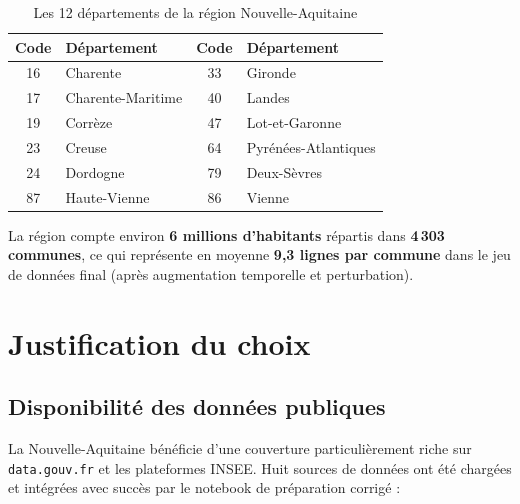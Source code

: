 \documentclass[12pt,a4paper,oneside]{report}
\begin{document}
\begin{table}[H]
  \centering
  \caption{Les 12 départements de la région Nouvelle-Aquitaine}
  \label{tab:departements}
  \begin{tabular}{clcl}
    \toprule
    \textbf{Code} & \textbf{Département} & \textbf{Code} & \textbf{Département} \\
    \midrule
    16 & Charente              & 33 & Gironde \\
    17 & Charente-Maritime     & 40 & Landes \\
    19 & Corrèze               & 47 & Lot-et-Garonne \\
    23 & Creuse                & 64 & Pyrénées-Atlantiques \\
    24 & Dordogne              & 79 & Deux-Sèvres \\
    87 & Haute-Vienne          & 86 & Vienne \\
    \bottomrule
  \end{tabular}
\end{table}

La région compte environ \textbf{6 millions d'habitants} répartis dans \textbf{4\,303 communes}, ce qui représente en moyenne \textbf{9,3 lignes par commune} dans le jeu de données final (après augmentation temporelle et perturbation).

\section{Justification du choix}

\subsection{Disponibilité des données publiques}

La Nouvelle-Aquitaine bénéficie d'une couverture particulièrement riche sur \texttt{data.gouv.fr} et les plateformes INSEE. Huit sources de données ont été chargées et intégrées avec succès par le notebook de préparation corrigé :
\end{document}

